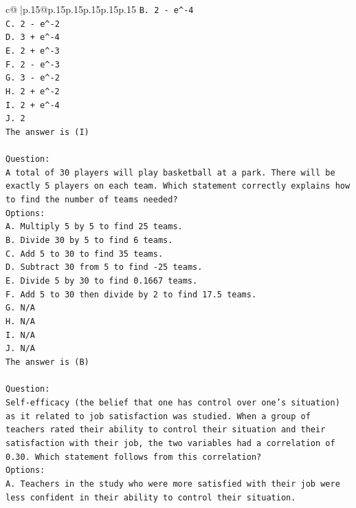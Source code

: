 \documentclass{article}
\begin{document}
{\begin{supertabular}{c@{$\;$}|p{.15\linewidth}@{}p{.15\linewidth}p{.15\linewidth}p{.15\linewidth}p{.15\linewidth}p{.15\linewidth}}
{{{\texttt{B. 2 {-} e\^{}{-}4} \\
\texttt{C. 2 {-} e\^{}{-}2} \\
\texttt{D. 3 + e\^{}{-}4} \\
\texttt{E. 2 + e\^{}{-}3} \\
\texttt{F. 2 {-} e\^{}{-}3} \\
\texttt{G. 3 {-} e\^{}{-}2} \\
\texttt{H. 2 + e\^{}{-}2} \\
\texttt{I. 2 + e\^{}{-}4} \\
\texttt{J. 2} \\
\texttt{The answer is (I)} \\
\\ 
\texttt{Question:} \\
\texttt{A total of 30 players will play basketball at a park. There will be exactly 5 players on each team. Which statement correctly explains how to find the number of teams needed?} \\
\texttt{Options:} \\
\texttt{A. Multiply 5 by 5 to find 25 teams.} \\
\texttt{B. Divide 30 by 5 to find 6 teams.} \\
\texttt{C. Add 5 to 30 to find 35 teams.} \\
\texttt{D. Subtract 30 from 5 to find {-}25 teams.} \\
\texttt{E. Divide 5 by 30 to find 0.1667 teams.} \\
\texttt{F. Add 5 to 30 then divide by 2 to find 17.5 teams.} \\
\texttt{G. N/A} \\
\texttt{H. N/A} \\
\texttt{I. N/A} \\
\texttt{J. N/A} \\
\texttt{The answer is (B)} \\
\\ 
\texttt{Question:} \\
\texttt{Self{-}efficacy (the belief that one has control over one's situation) as it related to job satisfaction was studied. When a group of teachers rated their ability to control their situation and their satisfaction with their job, the two variables had a correlation of 0.30. Which statement follows from this correlation?} \\
\texttt{Options:} \\
\texttt{A. Teachers in the study who were more satisfied with their job were less confident in their ability to control their situation.} \\
}}}
\end{supertabular}}
\end{document}
